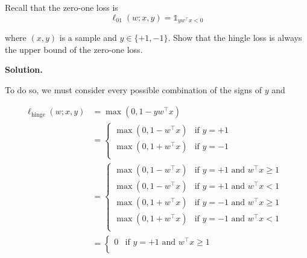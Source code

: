 \documentclass{exam}
\begin{document}
\begin{questions}
\begin{parts}
        {
            Recall that the zero-one loss is
            \begin{equation}\label{eq:zero-one}
                \ell_{01}(w; x, y) = \mathds{1}_{yw^\top x < 0}
            \end{equation}

            where $(x, y)$ is a sample and $y \in \{+1, -1\}$. Show that the hingle loss is always the upper bound of the zero-one loss.

            \textbf{Solution.}

            To do so, we must consider every possible combination of the signs of $y$ and

            \begin{align*}
                \ell_{\text{hinge}}(w; x, y) & = \max(0, 1 - yw^\top x)                                            \\
                                             & = \begin{cases}
                                                     \max(0, 1 - w^\top x) & \text{if $y = +1$ } \\
                                                     \max(0, 1 + w^\top x) & \text{if $y = -1$ } \\
                                                 \end{cases}                       \\
                                             & = \begin{cases}
                                                     \max(0, 1 - w^\top x) & \text{if $y = +1$ and $w^\top x \geq 1$ } \\
                                                     \max(0, 1 - w^\top x) & \text{if $y = +1$ and $w^\top x < 1$ }    \\
                                                     \max(0, 1 + w^\top x) & \text{if $y = -1$ and $w^\top x \geq 1$ } \\
                                                     \max(0, 1 + w^\top x) & \text{if $y = -1$ and $w^\top x < 1$ }    \\
                                                 \end{cases} \\
                                             & = \begin{cases}
                                                     0 & \text{if $y = +1$ and $w^\top x \geq 1$ } \\

\end{cases}
\end{align*}}
\end{parts}
\end{questions}
\end{document}

